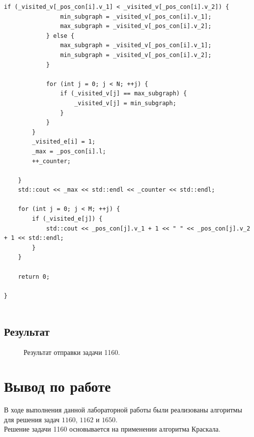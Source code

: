 \documentclass[a5paper, 10pt]{article}
\theoremstyle{definition}
\theoremstyle{plain}
\theoremstyle{remark}
\begin{document}
\begin{center}
\begin{lstlisting}[label=some-code,caption={Исходный код для 1160}]
            if (_visited_v[_pos_con[i].v_1] < _visited_v[_pos_con[i].v_2]) {
                min_subgraph = _visited_v[_pos_con[i].v_1];
                max_subgraph = _visited_v[_pos_con[i].v_2];
            } else {
                max_subgraph = _visited_v[_pos_con[i].v_1];
                min_subgraph = _visited_v[_pos_con[i].v_2];
            }

            for (int j = 0; j < N; ++j) {
                if (_visited_v[j] == max_subgraph) {
                    _visited_v[j] = min_subgraph;
                }
            }
        }
        _visited_e[i] = 1;
        _max = _pos_con[i].l;
        ++_counter;

    }
    std::cout << _max << std::endl << _counter << std::endl;

    for (int j = 0; j < M; ++j) {
        if (_visited_e[j]) {
            std::cout << _pos_con[j].v_1 + 1 << " " << _pos_con[j].v_2 + 1 << std::endl;
        }
    }

    return 0;

}


\end{lstlisting}
\end{center}

\subsection{Результат}
\begin{figure}[h]
\caption{Результат отправки задачи 1160.}
\end{figure}



\newpage
\section{Вывод по работе}
В ходе выполнения данной лабораторной работы были реализованы алгоритмы для решения задач $1160$, $1162$ и $1650$. \\

Решение задачи 1160 основывается на применении алгоритма Краскала.
\end{document}
